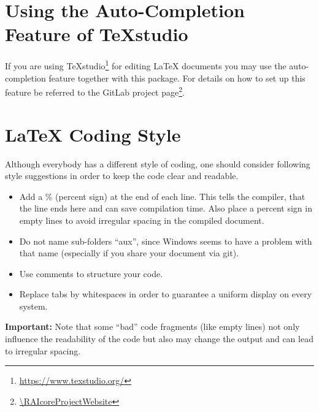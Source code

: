 \section{Using the Auto-Completion Feature of TeXstudio}%
\label{sec:backmatter_autocompletion}%
If you are using TeXstudio\footnote{\url{https://www.texstudio.org/}} for editing LaTeX documents you may use the auto-completion feature together with this package. For details on how to set up this feature be referred to the GitLab project page\footnote{\url{\RAIcoreProjectWebsite}}.\par%
%
%
\section{LaTeX Coding Style}%
Although everybody has a different style of coding, one should consider following style suggestions in order to keep the code clear and readable.\par%
%
\begin{itemize}\itemsep0pt%
    \item Add a \% (percent sign) at the end of each line. This tells the compiler, that the line ends here and can save compilation time. Also place a percent sign in empty lines to avoid irregular spacing in the compiled document.%
    \item Do not name sub-folders ``aux'', since Windows seems to have a problem with that name (especially if you share your document via git).%
    \item Use comments to structure your code.%
    \item Replace tabs by whitespaces in order to guarantee a uniform display on every system.%
\end{itemize}%
%
\textbf{Important:} Note that some ``bad'' code fragments (like empty lines) not only influence the readability of the code but also may change the output and can lead to irregular spacing.\par%
%
%
